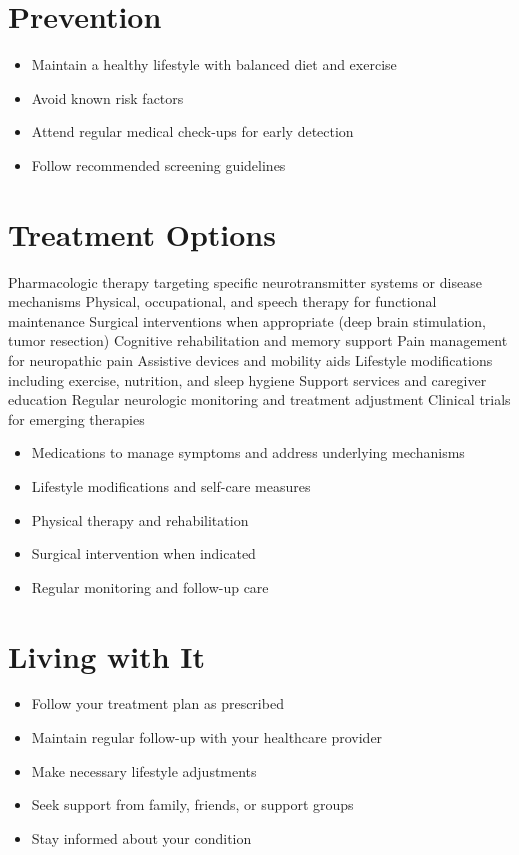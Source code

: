 \section{Prevention}
\begin{itemize}[noitemsep]
  \item Maintain a healthy lifestyle with balanced diet and exercise
  \item Avoid known risk factors
  \item Attend regular medical check-ups for early detection
  \item Follow recommended screening guidelines
\end{itemize}
\section{Treatment Options}
Pharmacologic therapy targeting specific neurotransmitter systems or disease mechanisms Physical, occupational, and speech therapy for functional maintenance Surgical interventions when appropriate (deep brain stimulation, tumor resection) Cognitive rehabilitation and memory support Pain management for neuropathic pain Assistive devices and mobility aids Lifestyle modifications including exercise, nutrition, and sleep hygiene Support services and caregiver education Regular neurologic monitoring and treatment adjustment Clinical trials for emerging therapies

\begin{itemize}[noitemsep]
  \item Medications to manage symptoms and address underlying mechanisms
  \item Lifestyle modifications and self-care measures
  \item Physical therapy and rehabilitation
  \item Surgical intervention when indicated
  \item Regular monitoring and follow-up care
\end{itemize}
\section{Living with It}
\begin{itemize}[noitemsep]
  \item Follow your treatment plan as prescribed
  \item Maintain regular follow-up with your healthcare provider
  \item Make necessary lifestyle adjustments
  \item Seek support from family, friends, or support groups
  \item Stay informed about your condition
\end{itemize}

